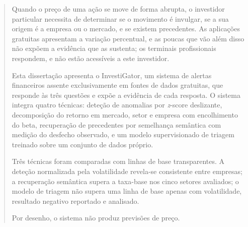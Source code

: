 
\begin{abstract}
Quando o preço de uma ação se move de forma abrupta, o investidor particular necessita de
determinar se o movimento é invulgar, se a sua origem é a empresa ou o mercado, e se existem
precedentes. As aplicações gratuitas apresentam a variação percentual, e as poucas que vão
além disso não expõem a evidência que as sustenta; os terminais profissionais respondem, e
não estão acessíveis a este investidor.

Esta dissertação apresenta o InvestiGator, um sistema de alertas financeiros assente exclusivamente
em fontes de dados gratuitas, que responde às três questões e expõe a evidência de cada
resposta. O sistema integra quatro técnicas: deteção de anomalias por \emph{z}-score deslizante,
decomposição do retorno em mercado, setor e empresa com encolhimento do beta, recuperação de
precedentes por semelhança semântica com medição do desfecho observado, e um modelo supervisionado
de triagem treinado sobre um conjunto de dados próprio.

Três técnicas foram comparadas com linhas de base transparentes. A deteção normalizada pela
volatilidade revela-se consistente entre empresas; a recuperação semântica supera a taxa-base nos
cinco setores avaliados; o modelo de triagem não supera uma linha de base apenas com
volatilidade, resultado negativo reportado e analisado.

Por desenho, o sistema não produz previsões de preço.
\end{abstract}

